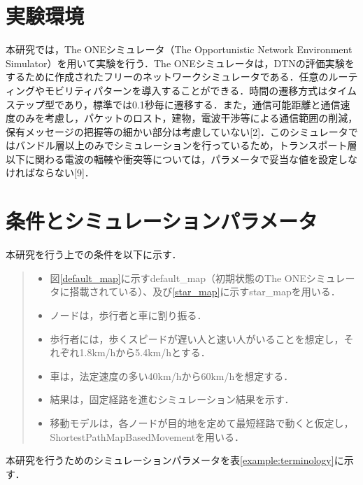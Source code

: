 \documentclass[11pt]{icsthesis}
\begin{document}
\section{実験環境}
本研究では，The ONEシミュレータ（The Opportunistic Network Environment Simulator）を用いて実験を行う．The ONEシミュレータは，DTNの評価実験をするために作成されたフリーのネットワークシミュレータである．任意のルーティングやモビリティパターンを導入することができる．時間の遷移方式はタイムステップ型であり，標準では0.1秒毎に遷移する．また，通信可能距離と通信速度のみを考慮し，パケットのロスト，建物，電波干渉等による通信範囲の削減，保有メッセージの把握等の細かい部分は考慮していない[2]．このシミュレータではバンドル層以上のみでシミュレーションを行っているため，トランスポート層以下に関わる電波の輻輳や衝突等については，パラメータで妥当な値を設定しなければならない[9]．

\section{条件とシミュレーションパラメータ}
本研究を行う上での条件を以下に示す．
\begin{quote}
 \begin{itemize}
  \item 図\ref{default_map}に示すdefault\_map（初期状態のThe ONEシミュレータに搭載されている）、及び\ref{star_map}に示すstar\_mapを用いる．
  \item ノードは，歩行者と車に割り振る．
  \item 歩行者には，歩くスピードが遅い人と速い人がいることを想定し，それぞれ1.8km/hから5.4km/hとする．
  \item 車は，法定速度の多い40km/hから60km/hを想定する．
  \item 結果は，固定経路を進むシミュレーション結果を示す．
  \item 移動モデルは，各ノードが目的地を定めて最短経路で動くと仮定し，ShortestPathMapBasedMovementを用いる．
 \end{itemize}
\end{quote}
本研究を行うためのシミュレーションパラメータを表\ref{example:terminology}に示す．
\end{document}
